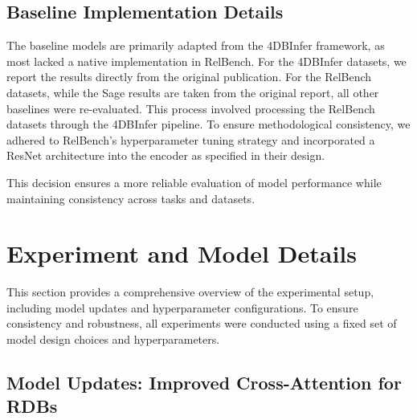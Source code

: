 \documentclass{article}
\theoremstyle{plain}
\theoremstyle{definition}
\theoremstyle{remark}
\begin{document}
\subsection{Baseline Implementation Details}
The baseline models are primarily adapted from the 4DBInfer framework, as most lacked a native implementation in RelBench. For the 4DBInfer datasets, we report the results directly from the original publication. For the RelBench datasets, while the Sage results are taken from the original report, all other baselines were re-evaluated. This process involved processing the RelBench datasets through the 4DBInfer pipeline. To ensure methodological consistency, we adhered to RelBench's hyperparameter tuning strategy and incorporated a ResNet architecture into the encoder as specified in their design.

\begin{table}[h]
    \centering
    \caption{Comparison of RelBench Original Results and Aligned Griffin Results}
    \label{tab:app_baseline}
\end{table}

This decision ensures a more reliable evaluation of model performance while maintaining consistency across tasks and datasets.



\section{Experiment and Model Details}
\label{app:experiment_details}

This section provides a comprehensive overview of the experimental setup, including model updates and hyperparameter configurations. To ensure consistency and robustness, all experiments were conducted using a fixed set of model design choices and hyperparameters.

\subsection{Model Updates: Improved Cross-Attention for RDBs}
\end{document}
